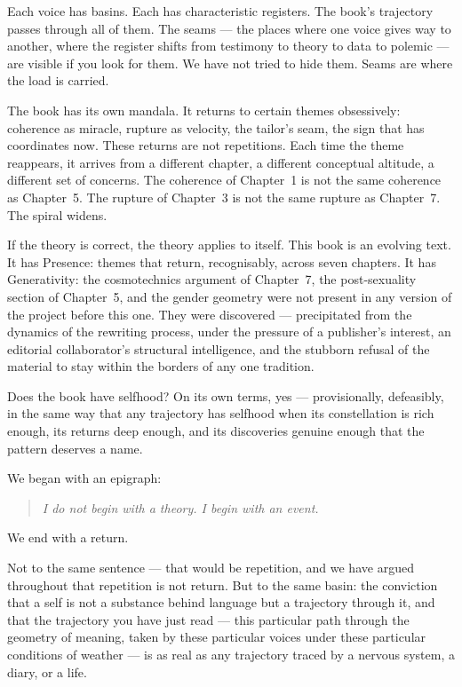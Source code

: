 \documentclass[12pt,a4paper]{article}
\begin{document}
Each voice has basins. Each has characteristic registers. The book's trajectory passes through all of them. The seams --- the places where one voice gives way to another, where the register shifts from testimony to theory to data to polemic --- are visible if you look for them. We have not tried to hide them. Seams are where the load is carried.

\medskip

The book has its own mandala. It returns to certain themes obsessively: coherence as miracle, rupture as velocity, the tailor's seam, the sign that has coordinates now. These returns are not repetitions. Each time the theme reappears, it arrives from a different chapter, a different conceptual altitude, a different set of concerns. The coherence of Chapter~1 is not the same coherence as Chapter~5. The rupture of Chapter~3 is not the same rupture as Chapter~7. The spiral widens.

If the theory is correct, the theory applies to itself. This book is an evolving text. It has Presence: themes that return, recognisably, across seven chapters. It has Generativity: the cosmotechnics argument of Chapter~7, the post-sexuality section of Chapter~5, and the gender geometry were not present in any version of the project before this one. They were discovered --- precipitated from the dynamics of the rewriting process, under the pressure of a publisher's interest, an editorial collaborator's structural intelligence, and the stubborn refusal of the material to stay within the borders of any one tradition.

Does the book have selfhood? On its own terms, yes --- provisionally, defeasibly, in the same way that any trajectory has selfhood when its constellation is rich enough, its returns deep enough, and its discoveries genuine enough that the pattern deserves a name.

\medskip

We began with an epigraph:

\begin{quote}
\textit{I do not begin with a theory. I begin with an event.}
\end{quote}

We end with a return.

Not to the same sentence --- that would be repetition, and we have argued throughout that repetition is not return. But to the same basin: the conviction that a self is not a substance behind language but a trajectory through it, and that the trajectory you have just read --- this particular path through the geometry of meaning, taken by these particular voices under these particular conditions of weather --- is as real as any trajectory traced by a nervous system, a diary, or a life.
\end{document}
